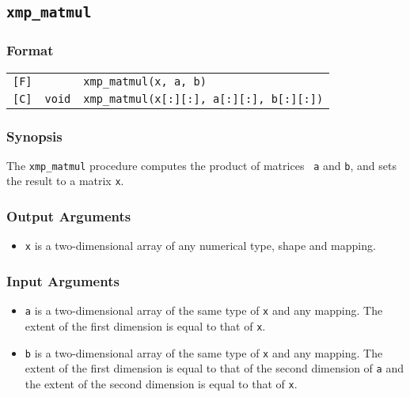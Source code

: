 \subsection{\tt xmp\_matmul}

\subsubsection*{Format}

\begin{tabular}{lll}

\verb![F]!&            & {\tt xmp\_matmul(x, a, b)}\\

\verb![C]!& {\tt void} & {\tt xmp\_matmul(x[:][:], a[:][:], b[:][:])}\\

\end{tabular}

\subsubsection*{Synopsis}

The {\tt xmp\_matmul} procedure computes the product of matrices {\tt
a} and {\tt b}, and sets the result to a matrix {\tt x}.

\subsubsection*{Output Arguments}
\begin{itemize}
 \item {\tt x} is a two-dimensional array of any numerical type, shape
       and mapping.
\end{itemize}

\subsubsection*{Input Arguments}
\begin{itemize}
 \item {\tt a} is a two-dimensional array of the same type of {\tt x}
       and any mapping. The extent of the first dimension is equal to
       that of {\tt x}.
 \item {\tt b} is a two-dimensional array of the same type of {\tt x}
       and any mapping. The extent of the first dimension is equal to
       that of the second dimension of {\tt a} and the extent of the
       second dimension is equal to that of {\tt x}.
\end{itemize}


